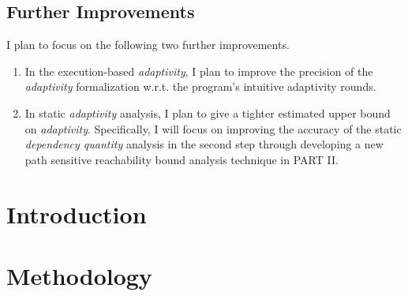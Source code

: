 \documentclass[a4paper,11pt]{article}
\newcommand{\THESYSTEM}{\textsf{AdaptFun}}
\begin{document}
\subsection{Further Improvements }
\label{sec:adapt-further}
I plan to focus on the following two further improvements.
\begin{enumerate}
    \item In the execution-based \emph{adaptivity},
    I plan to improve the precision of the \emph{adaptivity} formalization w.r.t. the program's intuitive adaptivity rounds.
\item In static \emph{adaptivity} analysis, I plan to give a tighter estimated upper bound on \emph{adaptivity}.
Specifically, I will focus on improving the accuracy of the static \emph{dependency quantity} analysis in the second step through 
developing a new path sensitive reachability bound analysis technique in PART II. 
\end{enumerate}

\section*{}
%

\section{Introduction}
\label{sec:reachability-intro}


\section{Methodology}
\label{sec:reachability-analysis}
\end{document}
